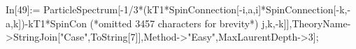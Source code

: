 In[49]:= ParticleSpectrum[-1/3*(kT1*SpinConnection[-i,a,i]*SpinConnection[-k,-a,k])-kT1*SpinCon (*omitted 3457 characters for brevity*) j,k,-k]],TheoryName->StringJoin["Case",ToString[7]],Method->"Easy",MaxLaurentDepth->3];
